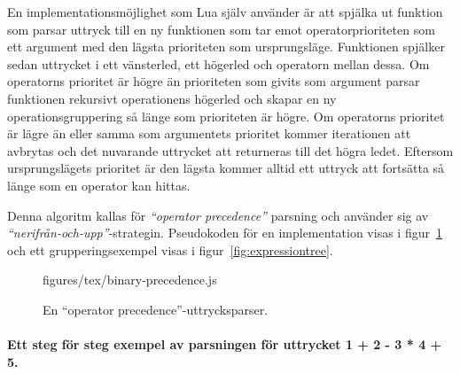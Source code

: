 En implementationsmöjlighet som Lua själv använder är att spjälka ut
funktion som parsar uttryck till en ny funktionen som tar emot
operatorprioriteten som ett argument med den lägsta prioriteten som
ursprungsläge. Funktionen spjälker sedan uttrycket i ett vänsterled, ett
högerled och operatorn mellan dessa. Om operatorns prioritet är högre än
prioriteten som givits som argument parsar funktionen rekursivt operationens
högerled och skapar en ny operationsgruppering så länge som prioriteten är
högre. Om operatorns prioritet är lägre än eller samma som argumentets
prioritet kommer iterationen att avbrytas och det nuvarande uttrycket att
returneras till det högra ledet. Eftersom ursprungslägets prioritet är den
lägsta kommer alltid ett uttryck att fortsätta så länge som en operator kan
hittas.

Denna algoritm kallas för \textit{``operator precedence''} parsning och
använder sig av \textit{``nerifrån-och-upp''}-strategin. Pseudokoden för en
implementation visas i figur~\ref{fig:binprecedence} och ett
grupperingsexempel visas i figur~\ref{fig:expressiontree}.

\begin{figure}[ht]
    {figures/tex/binary-precedence.js}
  \caption{En ``operator precedence''-uttrycksparser.}
  \label{fig:binprecedence}
\end{figure}

\paragraph{Ett steg för steg exempel av parsningen för uttrycket 1 + 2 - 3 * 4
+ 5.}


